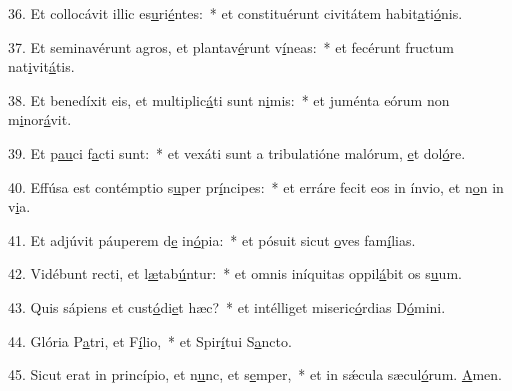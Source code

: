 36. Et collocávit illic es\uline{u}ri\uline{é}ntes:~* et constituérunt civitátem habit\uline{a}ti\uline{ó}nis.\par 
37. Et seminavérunt agros, et plantav\uline{é}runt v\uline{í}neas:~* et fecérunt fructum nat\uline{i}vit\uline{á}tis.\par 
38. Et benedíxit eis, et multiplic\uline{á}ti sunt n\uline{i}mis:~* et juménta eórum non m\uline{i}nor\uline{á}vit.\par 
39. Et p\uline{au}ci f\uline{a}cti sunt:~* et vexáti sunt a tribulatióne malórum, \uline{e}t dol\uline{ó}re.\par 
40. Effúsa est contémptio s\uline{u}per pr\uline{í}ncipes:~* et erráre fecit eos in ínvio, et n\uline{o}n in v\uline{i}a.\par 
41. Et adjúvit páuperem d\uline{e} in\uline{ó}pia:~* et pósuit sicut \uline{o}ves fam\uline{í}lias.\par 
42. Vidébunt recti, et l\uline{æ}tab\uline{ú}ntur:~* et omnis iníquitas oppil\uline{á}bit os s\uline{u}um.\par 
43. Quis sápiens et cust\uline{ó}di\uline{e}t hæc?~* et intélliget miseric\uline{ó}rdias D\uline{ó}mini.\par 
44. Glória P\uline{a}tri, et F\uline{í}lio,~* et Spir\uline{í}tui S\uline{a}ncto.\par 
45. Sicut erat in princípio, et n\uline{u}nc, et s\uline{e}mper,~* et in sǽcula sæcul\uline{ó}rum. \uline{A}men.\par 
